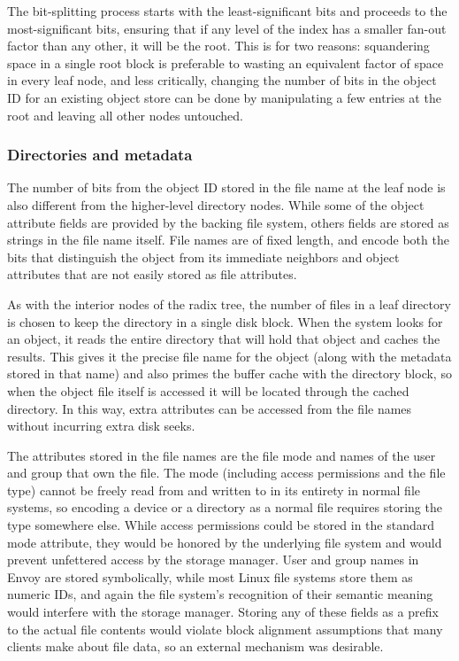 The bit-splitting process starts with the least-significant bits and proceeds to the most-significant bits, ensuring that if any level of the index has a smaller fan-out factor than any other, it will be the root. This is for two reasons: squandering space in a single root block is preferable to wasting an equivalent factor of space in every leaf node, and less critically, changing the number of bits in the object ID for an existing object store can be done by manipulating a few entries at the root and leaving all other nodes untouched.

\subsubsection{Directories and metadata}

The number of bits from the object ID stored in the file name at the leaf node is also different from the higher-level directory nodes. While some of the object attribute fields are provided by the backing file system, others fields are stored as strings in the file name itself. File names are of fixed length, and encode both the bits that distinguish the object from its immediate neighbors and object attributes that are not easily stored as file attributes.

As with the interior nodes of the radix tree, the number of files in a leaf directory is chosen to keep the directory in a single disk block. When the system looks for an object, it reads the entire directory that will hold that object and caches the results. This gives it the precise file name for the object (along with the metadata stored in that name) and also primes the buffer cache with the directory block, so when the object file itself is accessed it will be located through the cached directory. In this way, extra attributes can be accessed from the file names without incurring extra disk seeks.

The attributes stored in the file names are the file mode and names of the user and group that own the file. The mode (including access permissions and the file type) cannot be freely read from and written to in its entirety in normal file systems, so encoding a device or a directory as a normal file requires storing the type somewhere else. While access permissions could be stored in the standard mode attribute, they would be honored by the underlying file system and would prevent unfettered access by the storage manager. User and group names in Envoy are stored symbolically, while most Linux file systems store them as numeric IDs, and again the file system's recognition of their semantic meaning would interfere with the storage manager. Storing any of these fields as a prefix to the actual file contents would violate block alignment assumptions that many clients make about file data, so an external mechanism was desirable.

